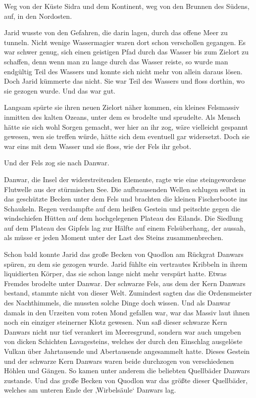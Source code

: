Weg von der Küste Sidra und dem Kontinent, weg von den Brunnen des Südens, auf, in den Nordosten.

Jarid wusste von den Gefahren, die darin lagen, durch das offene Meer zu tunneln. Nicht wenige Wassermagier waren dort schon verschollen gegangen. Es war schwer genug, sich einen geistigen Pfad durch das Wasser bis zum Zielort zu schaffen, denn wenn man zu lange durch das Wasser reiste, so wurde man endgültig Teil des Wassers und konnte sich nicht mehr von allein daraus lösen. Doch Jarid kümmerte das nicht. Sie war Teil des Wassers und floss dorthin, wo sie gezogen wurde. Und das war gut.

Langsam spürte sie ihren neuen Zielort näher kommen, ein kleines Felsmassiv inmitten des kalten Ozeans, unter dem es brodelte und sprudelte. Als Mensch hätte sie sich wohl Sorgen gemacht, wer hier an ihr zog, wäre vielleicht gespannt gewesen, wen sie treffen würde, hätte sich dem eventuell gar widersetzt. Doch sie war eins mit dem Wasser und sie floss, wie der Fels ihr gebot.

Und der Fels zog sie nach Danwar.

Danwar, die Insel der widerstreitenden Elemente, ragte wie eine steingewordene Flutwelle aus der stürmischen See. Die aufbrausenden Wellen schlugen selbst in das geschützte Becken unter dem Fels und brachten die kleinen Fischerboote ins Schaukeln. Regen verdampfte auf dem heißen Gestein und peitschte gegen die windschiefen Hütten auf dem hochgelegenen Plateau des Eilands. Die Siedlung auf dem Plateau des Gipfels lag zur Hälfte auf einem Felsüberhang, der aussah, als müsse er jeden Moment unter der Last des Steins zusammenbrechen.

Schon bald konnte Jarid das große Becken von Quodlon am Rückgrat Danwars spüren, zu dem sie gezogen wurde. Jarid fühlte ein vertrautes Kribbeln in ihrem liquidierten Körper, das sie schon lange nicht mehr verspürt hatte. Etwas Fremdes brodelte unter Danwar. Der schwarze Fels, aus dem der Kern Danwars bestand, stammte nicht von dieser Welt. Zumindest sagten das die Ordensmeister des Nachthimmels, die mussten solche Dinge doch wissen. Und als Danwar damals in den Urzeiten vom roten Mond gefallen war, war das Massiv laut ihnen noch ein einziger steinerner Klotz gewesen. Nun saß dieser schwarze Kern Danwars nicht nur tief verankert im Meeresgrund, sondern war auch umgeben von dicken Schichten Lavagesteins, welches der durch den Einschlag ausgelöste Vulkan über Jahrtausende und Abertausende angesammelt hatte. Dieses Gestein und der schwarze Kern Danwars waren beide durchzogen von verschiedenen Höhlen und Gängen. So kamen unter anderem die beliebten Quellbäder Danwars zustande. Und das große Becken von Quodlon war das größte dieser Quellbäder, welches am unteren Ende der ‚Wirbelsäule‘ Danwars lag.


